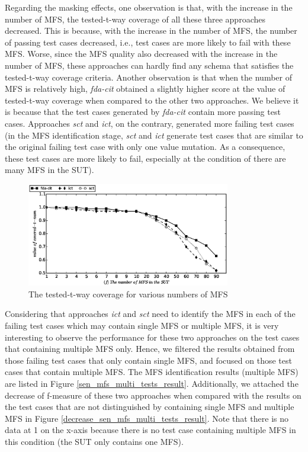 \documentclass[journal,12pt,onecolumn,draftclsnofoot,]{IEEEtran}
\begin{document}
Regarding the masking effects, one observation is that, with the increase in the number of MFS,  the tested-t-way coverage of all these three approaches decreased. This is because, with the increase in the number of MFS, the number of passing test cases decreased, i.e., test cases are more likely to fail with these MFS. Worse, since the MFS quality also decreased  with the increase in the number of MFS, these approaches can hardly find any schema that satisfies the tested-t-way coverage criteria. Another observation is that when the number of MFS is relatively high, \emph{fda-cit} obtained a slightly higher score at the value of tested-t-way coverage when compared to the other two approaches. We believe it is because that the test cases generated by \emph{fda-cit} contain more passing test cases. Approaches \emph{sct} and \emph{ict}, on the contrary, generated more failing test cases (in the MFS identification stage, \emph{sct} and \emph{ict} generate test cases that are similar to the original failing test case with only one value mutation. As a consequence, these test cases are more likely to fail, especially at the condition of there are many MFS in the SUT).

\begin{figure}[htbp]
 \includegraphics[width=3.5in]{num_mfs_t_tuple.eps}
\caption{The tested-t-way coverage for various numbers of MFS}
\label{sen_mfs_t_tuple_result}
\end{figure}




Considering that approaches \emph{ict} and \emph{sct} need to identify the MFS in each of the failing test cases which may contain single MFS or multiple MFS, it is very interesting to observe the performance for these two approaches on the test cases that containing multiple MFS only. Hence, we filtered the results obtained from those failing test cases that only contain single MFS, and focused on those test cases that contain multiple MFS. The MFS identification results (multiple MFS) are listed in Figure \ref{sen_mfs_multi_tests_result}. Additionally, we attached the decrease of f-measure of these two approaches when compared with the results on the test cases that are  not distinguished by containing single MFS and multiple MFS in Figure \ref{decrease_sen_mfs_multi_tests_result}. Note that there is no data at 1 on the x-axis because there is no test case containing multiple MFS in this condition (the SUT only contains one MFS).
\end{document}
